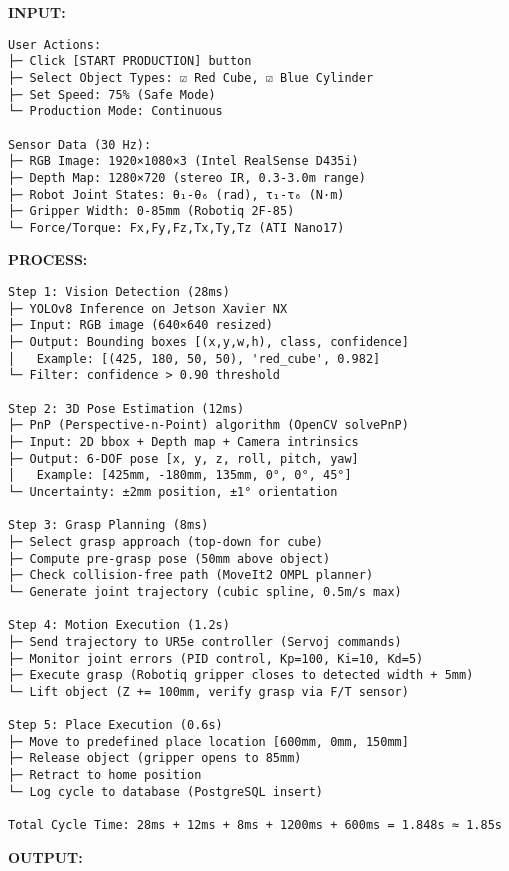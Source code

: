 \documentclass[
]{article}
\begin{document}
\textbf{INPUT:}

\begin{verbatim}
User Actions:
├─ Click [START PRODUCTION] button
├─ Select Object Types: ☑ Red Cube, ☑ Blue Cylinder
├─ Set Speed: 75% (Safe Mode)
└─ Production Mode: Continuous

Sensor Data (30 Hz):
├─ RGB Image: 1920×1080×3 (Intel RealSense D435i)
├─ Depth Map: 1280×720 (stereo IR, 0.3-3.0m range)
├─ Robot Joint States: θ₁-θ₆ (rad), τ₁-τ₆ (N·m)
├─ Gripper Width: 0-85mm (Robotiq 2F-85)
└─ Force/Torque: Fx,Fy,Fz,Tx,Ty,Tz (ATI Nano17)
\end{verbatim}

\textbf{PROCESS:}

\begin{verbatim}
Step 1: Vision Detection (28ms)
├─ YOLOv8 Inference on Jetson Xavier NX
├─ Input: RGB image (640×640 resized)
├─ Output: Bounding boxes [(x,y,w,h), class, confidence]
│   Example: [(425, 180, 50, 50), 'red_cube', 0.982]
└─ Filter: confidence > 0.90 threshold

Step 2: 3D Pose Estimation (12ms)
├─ PnP (Perspective-n-Point) algorithm (OpenCV solvePnP)
├─ Input: 2D bbox + Depth map + Camera intrinsics
├─ Output: 6-DOF pose [x, y, z, roll, pitch, yaw]
│   Example: [425mm, -180mm, 135mm, 0°, 0°, 45°]
└─ Uncertainty: ±2mm position, ±1° orientation

Step 3: Grasp Planning (8ms)
├─ Select grasp approach (top-down for cube)
├─ Compute pre-grasp pose (50mm above object)
├─ Check collision-free path (MoveIt2 OMPL planner)
└─ Generate joint trajectory (cubic spline, 0.5m/s max)

Step 4: Motion Execution (1.2s)
├─ Send trajectory to UR5e controller (Servoj commands)
├─ Monitor joint errors (PID control, Kp=100, Ki=10, Kd=5)
├─ Execute grasp (Robotiq gripper closes to detected width + 5mm)
└─ Lift object (Z += 100mm, verify grasp via F/T sensor)

Step 5: Place Execution (0.6s)
├─ Move to predefined place location [600mm, 0mm, 150mm]
├─ Release object (gripper opens to 85mm)
├─ Retract to home position
└─ Log cycle to database (PostgreSQL insert)

Total Cycle Time: 28ms + 12ms + 8ms + 1200ms + 600ms = 1.848s ≈ 1.85s
\end{verbatim}

\textbf{OUTPUT:}
\end{document}
